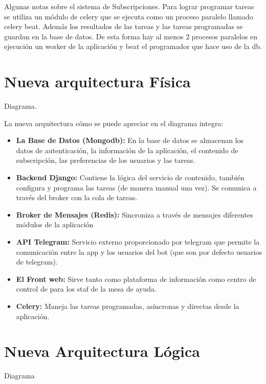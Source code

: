         \par Algunas notas sobre el sistema de Subscripciones. Para lograr programar tareas se utiliza un módulo de celery que se ejecuta como un proceso paralelo llamado celery beat. Además los resultados de las tareas y las tareas programadas se guardan en la base de datos. De esta forma hay al menos 2 procesos paralelos en ejecución un worker de la aplicación y beat el programador que hace uso de la db.

\section{Nueva arquitectura Física}

    Diagrama.


    \par La nueva arquitectura cómo se puede apreciar en el diagrama integra:
    \begin{itemize}
        \item \textbf{La Base de Datos (Mongodb):}  En la base de datos se almacenan los datos de autenticación, la información de la aplicación, el contenido de subscripción, las preferencias de los usuarios y las tareas.
        \item  \textbf{Backend Django:} Contiene la lógica del servicio de contenido, también configura y programa las tareas (de manera manual una vez). Se comunica a través del broker con la cola de tareas.
        \item \textbf{Broker de Mensajes (Redis):} Sincroniza a través de mensajes diferentes módulos de la aplicación
        \item  \textbf{API Telegram:} Servicio externo proporcionado por telegram que permite la comunicación entre la app y los usuarios del bot (que son por defecto usuarios de telegram).
        \item  \textbf{El Front web:} Sirve tanto como plataforma de información como centro de control de para los staf de la mesa de ayuda.
        \item \textbf{Celery:} Maneja las tareas programadas, asíncronas y directas desde la aplicación.
    \end{itemize}
    
   
\section{Nueva Arquitectura Lógica}

    Diagrama

